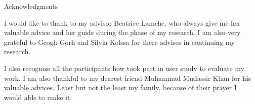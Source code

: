 \thispagestyle{empty}

\vspace*{2cm}

\begin{center}
{ Acknowledgments}
\end{center}

\vspace{1cm}

I would like to thank to my advisor Beatrice Lamche, who always give me her valuable advice and her guide during the phase of my research. I am also very grateful to Geogh Gorh and Silvia Kolssa for there advises in continuing my research.\newline

I also recognize all the participants how took part in user study to evaluate my work. I am also thankful to my dearest friend Muhammad Mudassir Khan for his valuable advices. Least but not the least my family, because of their prayer I would able to make it.

\cleardoublepage{}
